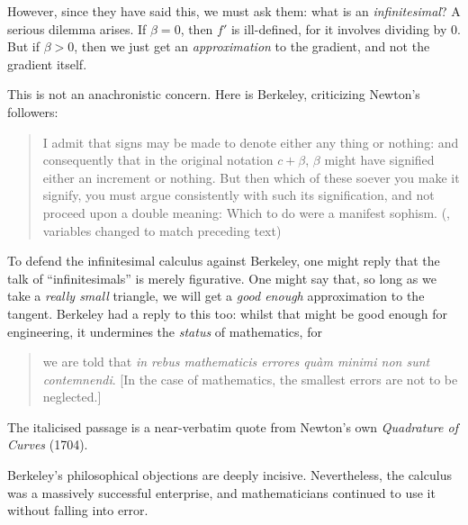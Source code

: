 \documentclass[../../../include/open-logic-section]{subfiles}
\begin{document}
However, since they have said this, we must ask them: what is an \emph{infinitesimal}? A serious dilemma arises. If $\beta = 0$, then $f'$ is ill-defined, for it involves dividing by $0$. But if $\beta > 0$, then we just get an \emph{approximation} to the gradient, and not the gradient itself. 

This is not an anachronistic concern. Here is Berkeley, criticizing Newton's followers:
\begin{quote}
	I admit that signs may be made to denote either any thing or nothing: and consequently that in the original notation $c + \beta$, $\beta$ might have signified either an increment or nothing. But then which of these soever you make it signify, you must argue consistently with such its signification, and not proceed upon a double meaning: Which to do were a manifest sophism. (\citealt[\S{}XIII]{Berkeley1734}, variables changed to match preceding text)
\end{quote}
To defend the infinitesimal calculus against Berkeley, one might reply that the talk of ``infinitesimals'' is merely figurative. One might say that, so long as we take a \emph{really small} triangle, we will get a \emph{good enough} approximation to the tangent. Berkeley had a reply to this too: whilst that might be good enough for engineering, it undermines the \emph{status} of mathematics,  for
\begin{quote}
	we are told that \emph{in rebus mathematicis errores qu\`{a}m minimi non sunt contemnendi}. [In the case of mathematics, the smallest errors are not to be neglected.] \citep[\S{}IX]{Berkeley1734}
\end{quote}
The italicised passage is a near-verbatim quote from Newton's own \emph{Quadrature of Curves} (1704). 

Berkeley's philosophical objections are deeply incisive. Nevertheless, the calculus was a massively successful enterprise, and mathematicians continued to use it without falling into error.
\end{document}
